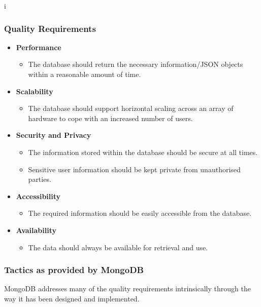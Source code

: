 i\documentclass[a4paper,12pt]{article}
\begin{document}
	\subsubsection{Quality Requirements}
	\begin{itemize}
		\item\textbf{Performance}
		\begin{itemize}
			\item The database should return the necessary information/JSON objects within a reasonable amount of time.
		\end{itemize}
		
		\item\textbf{Scalability}
		\begin{itemize}
			\item The database should support horizontal scaling across an array of hardware to cope with an increased number of users. 
		\end{itemize}
		
		\item\textbf{Security and Privacy}
		\begin{itemize}
			\item The information stored within the database should be secure at all times.
			\item Sensitive user information should be kept private from unauthorised parties.
		\end{itemize}
		
		\item\textbf{Accessibility}
		\begin{itemize}
			\item The required information should be easily accessible from the database.
		\end{itemize}
		
		\item\textbf{Availability}
		\begin{itemize}
			\item The data should always be available for retrieval and use.
		\end{itemize}
	\end{itemize}
	
	\subsubsection{Tactics as provided by MongoDB}
	MongoDB addresses many of the quality requirements intrinsically through the way it has been designed and implemented.
	
\end{document}
